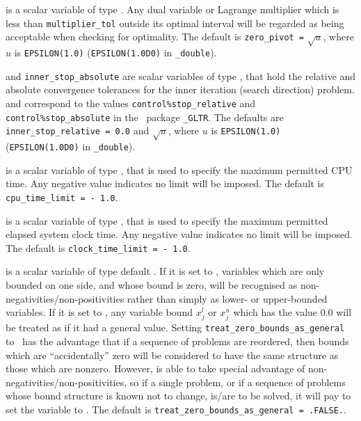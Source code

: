 \begin{description}
 is a scalar variable of type \realdp.
Any dual variable or Lagrange multiplier which is less than
{\tt multiplier\_tol} outside its optimal interval will be regarded
as being acceptable when checking for optimality.
The default is {\tt zero\_pivot =} $\sqrt{u}$,
where $u$ is {\tt EPSILON(1.0)} ({\tt EPSILON(1.0D0)} in
{\tt \fullpackagename\_dou\-ble}).

 and {\tt inner\_stop\_absolute}
are scalar variables of type \realdp,
that hold the relative and absolute convergence tolerances for the
inner iteration (search direction) problem.
and correspond to the values {\tt control\%stop\_relative} and
{\tt control\%stop\_absolute} in the \galahad\ package
{\tt \libraryname\_GLTR}.
The defaults are {\tt inner\_stop\_relative = 0.0}
and  $\sqrt{u}$,
where $u$ is {\tt EPSILON(1.0)} ({\tt EPSILON(1.0D0)} in
{\tt \fullpackagename\_double}).

 is a scalar variable of type \realdp,
that is used to specify the maximum permitted CPU time. Any negative
value indicates no limit will be imposed. The default is
{\tt cpu\_time\_limit = - 1.0}.

 is a scalar variable of type \realdp,
that is used to specify the maximum permitted elapsed system clock time.
Any negative value indicates no limit will be imposed. The default is
{\tt clock\_time\_limit = - 1.0}.

 is a scalar variable of type
default \logical.
If it is set to \false, variables which
are only bounded on one side, and whose bound is zero,
will be recognised as non-negativities/non-positivities rather than simply as
lower- or upper-bounded variables.
If it is set to \true, any variable bound
$x_{j}^{l}$ or $x_{j}^{u}$ which has the value 0.0 will be
treated as if it had a general value.
Setting {\tt treat\_zero\_bounds\_as\_general} to \true\ has the advantage
that if a sequence of problems are reordered, then bounds which are
``accidentally'' zero will be considered to have the same structure as
those which are nonzero. However, {\tt \fullpackagename} is
able to take special advantage of non-negativities/non-positivities, so
if a single problem, or if a sequence of problems whose
bound structure is known not to change, is/are to be solved,
it will pay to set the variable to \false.
The default is {\tt treat\_zero\_bounds\_as\_general = .FALSE.}.

\end{description}

